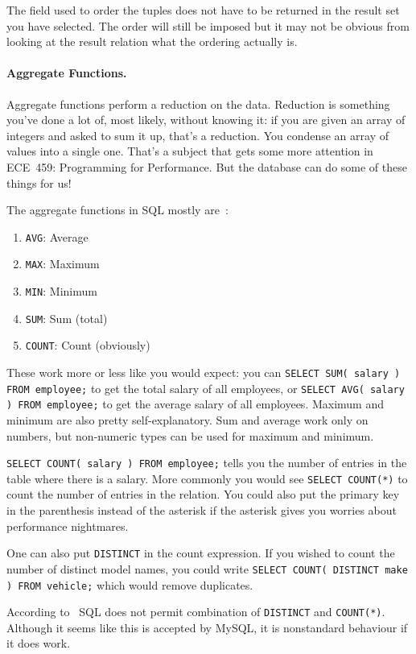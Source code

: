 The field used to order the tuples does not have to be returned in the result set you have selected. The order will still be imposed but it may not be obvious from looking at the result relation what the ordering actually is.

\paragraph{Aggregate Functions.} Aggregate functions perform a reduction on the data. Reduction is something you've done a lot of, most likely, without knowing it: if you are given an array of integers and asked to sum it up, that's a reduction. You condense an array of values into a single one. That's a subject that gets some more attention in ECE~459: Programming for Performance. But the database can do some of these things for us!

The aggregate functions in SQL mostly are~\cite{dsc}:
\begin{enumerate}
	\item \texttt{AVG}: Average 
	\item \texttt{MAX}: Maximum
	\item \texttt{MIN}: Minimum
	\item \texttt{SUM}: Sum (total)
	\item \texttt{COUNT}: Count (obviously)
\end{enumerate}

These work more or less like you would expect: you can \texttt{SELECT SUM( salary ) FROM employee;} to get the total salary of all employees, or \texttt{SELECT AVG( salary ) FROM employee;} to get the average salary of all employees. Maximum and minimum are also pretty self-explanatory. Sum and average work only on numbers, but non-numeric types can be used for maximum and minimum. 

\texttt{SELECT COUNT( salary ) FROM employee;} tells you the number of entries in the table where there is a salary. More commonly you would see \texttt{SELECT COUNT(*)} to count the number of entries in the relation. You could also put the primary key in the parenthesis instead of the asterisk if the asterisk gives you worries about performance nightmares.

One can also put \texttt{DISTINCT} in the count expression. If you wished to count the number of distinct model names, you could write \texttt{SELECT COUNT( DISTINCT make ) FROM vehicle;} which would remove duplicates.

According to~\cite{dsc} SQL does not permit combination of \texttt{DISTINCT} and \texttt{COUNT(*)}. Although it seems like this is accepted by MySQL, it is nonstandard behaviour if it does work. 

